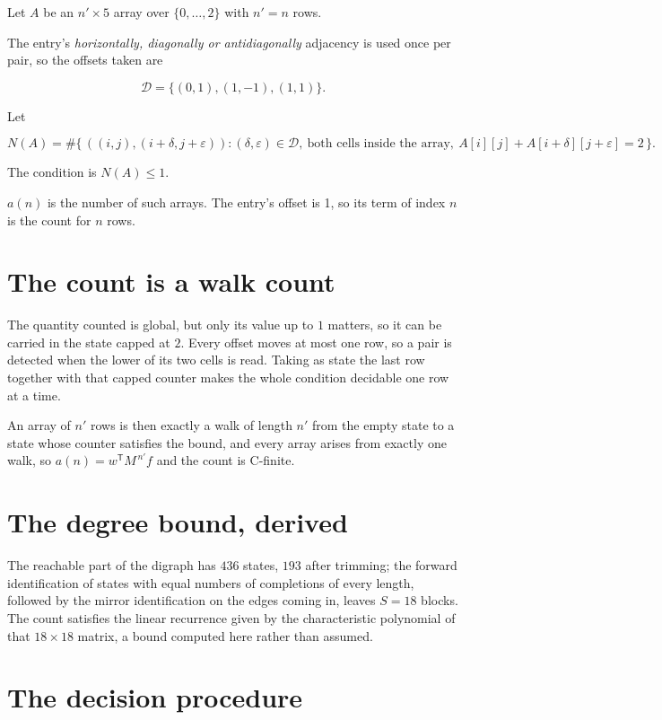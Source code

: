 \documentclass[11pt]{article}
\theoremstyle{definition}
\begin{document}
Let $A$ be an $n' \times 5$ array over $\{0,\dots,2\}$ with $n' = n$ rows.

The entry's {\itshape horizontally, diagonally or antidiagonally} adjacency is used once per pair, so the offsets taken are

\[\mathcal{D} = \{(0,1), (1,-1), (1,1)\}.\]

Let

\[N(A) = \#\bigl\{\,((i,j),(i{+}\delta,j{+}\varepsilon)) : (\delta,\varepsilon) \in \mathcal{D},\ \text{both cells inside the array},\ A[i][j] + A[i{+}\delta][j{+}\varepsilon] = 2\,\bigr\}.\]

The condition is $N(A) \le 1$.

$a(n)$ is the number of such arrays. The entry's offset is 1, so its term of index $n$ is the count for $n$ rows.

\section{The count is a walk count}

The quantity counted is global, but only its value up to $1$ matters, so it can be carried in the state capped at $2$. Every offset moves at most one row, so a pair is detected when the lower of its two cells is read. Taking as state the last row together with that capped counter makes the whole condition decidable one row at a time.

An array of $n'$ rows is then exactly a walk of length $n'$ from the empty state to a state whose counter satisfies the bound, and every array arises from exactly one walk, so $a(n) = w^{\mathsf T}M^{\,n'}f$ and the count is C-finite.

\section{The degree bound, derived}

The reachable part of the digraph has $436$ states, $193$ after trimming; the forward identification of states with equal numbers of completions of every length, followed by the mirror identification on the edges coming in, leaves $S = 18$ blocks. The count satisfies the linear recurrence given by the characteristic polynomial of that $18\times18$ matrix, a bound computed here rather than assumed.

\section{The decision procedure}
\end{document}
